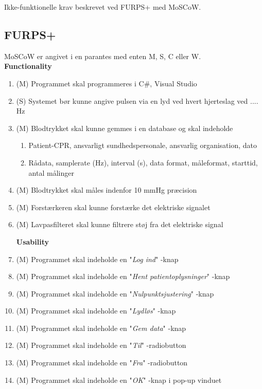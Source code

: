 Ikke-funktionelle krav beskrevet ved FURPS+ med MoSCoW.

\subsection{FURPS+}
MoSCoW er angivet i en parantes med enten M, S, C eller W. 
\\

\textbf{Functionality}
\begin{enumerate}
\item (M) Programmet skal programmeres i C$\#$, Visual Studio
\item (S) Systemet bør kunne angive pulsen via en lyd ved hvert hjerteslag ved .... Hz
\item (M) Blodtrykket skal kunne gemmes i en database og skal indeholde 
\begin{enumerate} 
\item Patient-CPR, ansvarligt sundhedspersonale, ansvarlig organisation, dato
\item Rådata, samplerate (Hz), interval (s), data format, måleformat, starttid, antal målinger
\end{enumerate}
\item (M) Blodtrykket skal måles indenfor 10 mmHg præcision
\item (M) Forstærkeren skal kunne forstærke det elektriske signalet 
\item (M) Lavpasfilteret skal kunne filtrere støj fra det elektriske signal

\noindent 
\textbf{Usability}
\item (M) Programmet skal indeholde en "\textit{Log ind}"\- -knap
\item (M) Programmet skal indeholde en "\textit{Hent patientoplysninger}"\- -knap
\item (M) Programmet skal indeholde en "\textit{Nulpunktsjustering}"\- -knap
\item (M) Programmet skal indeholde en "\textit{Lydløs}"\- -knap
\item (M) Programmet skal indeholde en "\textit{Gem data}"\- -knap
\item (M) Programmet skal indeholde en "\textit{Til}"\- -radiobutton
\item (M) Programmet skal indeholde en "\textit{Fra}"\- -radiobutton
\item (M) Programmet skal indeholde en "\textit{OK}"\- -knap i pop-up vinduet


\end{enumerate}
